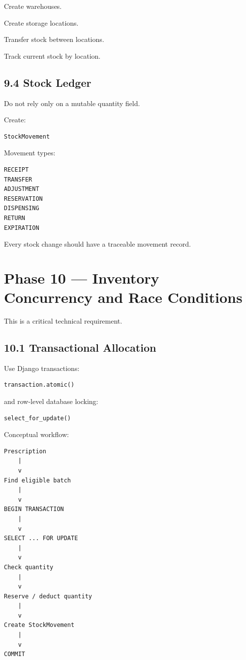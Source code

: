 \documentclass[11pt,a4paper]{article}
\newcommand{\task}[1]{\item[$\square$] #1}
\begin{document}
\task{Create warehouses.}
\task{Create storage locations.}
\task{Transfer stock between locations.}
\task{Track current stock by location.}

\subsection{9.4 Stock Ledger}

Do not rely only on a mutable quantity field.

Create:

\begin{lstlisting}
StockMovement
\end{lstlisting}

Movement types:

\begin{lstlisting}
RECEIPT
TRANSFER
ADJUSTMENT
RESERVATION
DISPENSING
RETURN
EXPIRATION
\end{lstlisting}

Every stock change should have a traceable movement record.

\section{Phase 10 --- Inventory Concurrency and Race Conditions}

This is a critical technical requirement.

\subsection{10.1 Transactional Allocation}

Use Django transactions:

\begin{lstlisting}
transaction.atomic()
\end{lstlisting}

and row-level database locking:

\begin{lstlisting}
select_for_update()
\end{lstlisting}

Conceptual workflow:

\begin{lstlisting}
Prescription
    |
    v
Find eligible batch
    |
    v
BEGIN TRANSACTION
    |
    v
SELECT ... FOR UPDATE
    |
    v
Check quantity
    |
    v
Reserve / deduct quantity
    |
    v
Create StockMovement
    |
    v
COMMIT
\end{lstlisting}
\end{document}
